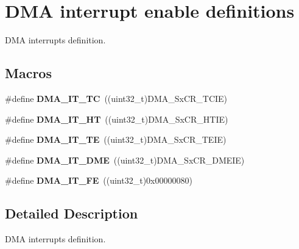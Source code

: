 \hypertarget{group___d_m_a__interrupt__enable__definitions}{}\section{D\+MA interrupt enable definitions}
\label{group___d_m_a__interrupt__enable__definitions}


D\+MA interrupts definition.  


\subsection*{Macros}
\begin{DoxyCompactItemize}
\item 
\#define {\bfseries D\+M\+A\+\_\+\+I\+T\+\_\+\+TC}~((uint32\+\_\+t)D\+M\+A\+\_\+\+Sx\+C\+R\+\_\+\+T\+C\+IE)\hypertarget{group___d_m_a__interrupt__enable__definitions_ga06e83dd277e0d3e5635cf8ce8dfd6e16}{}\label{group___d_m_a__interrupt__enable__definitions_ga06e83dd277e0d3e5635cf8ce8dfd6e16}

\item 
\#define {\bfseries D\+M\+A\+\_\+\+I\+T\+\_\+\+HT}~((uint32\+\_\+t)D\+M\+A\+\_\+\+Sx\+C\+R\+\_\+\+H\+T\+IE)\hypertarget{group___d_m_a__interrupt__enable__definitions_gadf11c572b9797e04a14b105fdc2e5f66}{}\label{group___d_m_a__interrupt__enable__definitions_gadf11c572b9797e04a14b105fdc2e5f66}

\item 
\#define {\bfseries D\+M\+A\+\_\+\+I\+T\+\_\+\+TE}~((uint32\+\_\+t)D\+M\+A\+\_\+\+Sx\+C\+R\+\_\+\+T\+E\+IE)\hypertarget{group___d_m_a__interrupt__enable__definitions_gaf9d92649d2a0146f663ff253d8f3b59e}{}\label{group___d_m_a__interrupt__enable__definitions_gaf9d92649d2a0146f663ff253d8f3b59e}

\item 
\#define {\bfseries D\+M\+A\+\_\+\+I\+T\+\_\+\+D\+ME}~((uint32\+\_\+t)D\+M\+A\+\_\+\+Sx\+C\+R\+\_\+\+D\+M\+E\+IE)\hypertarget{group___d_m_a__interrupt__enable__definitions_ga71137443f7bdced1ee80697596e9ea98}{}\label{group___d_m_a__interrupt__enable__definitions_ga71137443f7bdced1ee80697596e9ea98}

\item 
\#define {\bfseries D\+M\+A\+\_\+\+I\+T\+\_\+\+FE}~((uint32\+\_\+t)0x00000080)\hypertarget{group___d_m_a__interrupt__enable__definitions_ga93164ec039fc5579662c382e68d7d13f}{}\label{group___d_m_a__interrupt__enable__definitions_ga93164ec039fc5579662c382e68d7d13f}

\end{DoxyCompactItemize}


\subsection{Detailed Description}
D\+MA interrupts definition. 

